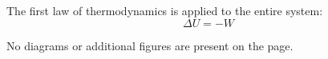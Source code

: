 The first law of thermodynamics is applied to the entire system:  
\[
\Delta U = -W
\]  

No diagrams or additional figures are present on the page.